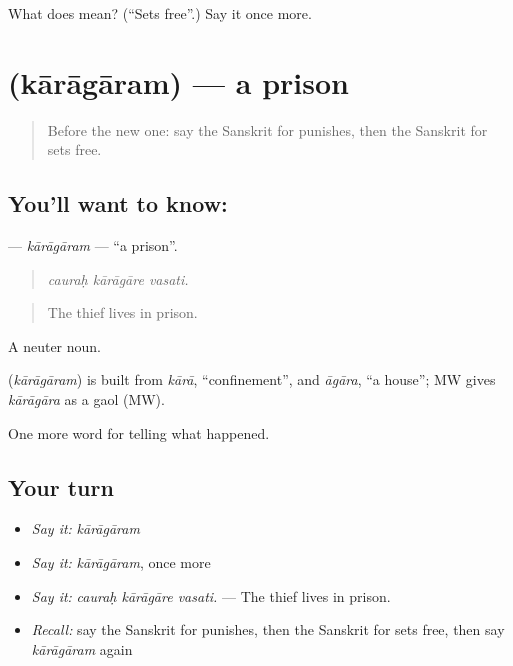 \begin{tcolorbox}[breakable,colback=teal!4,colframe=teal!35!black,title={Before you move on}]
What does  mean? (\textquotedblleft{}Sets free\textquotedblright{}.) Say it once more.
\end{tcolorbox}
\section[\texorpdfstring{\sk{कारागारम्} (kārāgāram)}{कारागारम् (kārāgāram)}]{ (kārāgāram) — a prison}

\label{lesson:SA-C293-karagaram}



\begin{quote}
Before the new one: say the Sanskrit for punishes, then the Sanskrit for sets free.
\end{quote}

\subsection*{You'll want to know: }
\textbf{} — \emph{kārāgāram} — \textquotedblleft{}a prison\textquotedblright{}.

\begin{quote}
  
\end{quote}

\begin{quote}
\emph{cauraḥ kārāgāre vasati.}
\end{quote}

\begin{quote}
The thief lives in prison.
\end{quote}

A neuter noun.

\begin{cousinweb}
\textbf{} (\emph{kārāgāram}) is built from \emph{kārā}, \textquotedblleft{}confinement\textquotedblright{}, and \emph{āgāra}, \textquotedblleft{}a house\textquotedblright{}; MW gives \emph{kārāgāra} as a gaol (MW).
\end{cousinweb}

\begin{grammarlens}[title={What you've built}]
One more word for telling what happened.
\end{grammarlens}

\subsection*{Your turn}
\begin{itemize}
\raggedright
  \item \emph{Say it:} \emph{kārāgāram}
  \item \emph{Say it:} \emph{kārāgāram}, once more
  \item \emph{Say it:} \emph{cauraḥ kārāgāre vasati.} — The thief lives in prison.
  \item \emph{Recall:} say the Sanskrit for punishes, then the Sanskrit for sets free, then say \emph{kārāgāram} again
\end{itemize}

